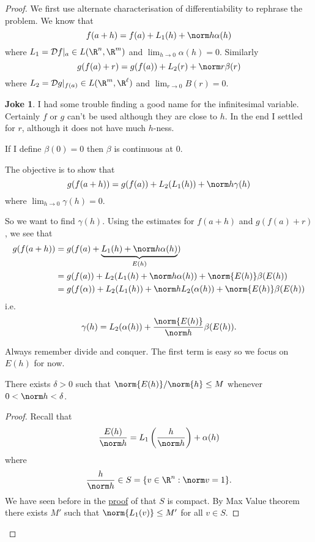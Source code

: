 \documentclass[a4paper]{article}
\newcommand*{\D}{\mathcal{D}}
\theoremstyle{definition}
\newtheorem*{joke}{Joke}
\begin{document}
\begin{proof}
  We first use alternate characterisation of differentiability to rephrase the problem. We know that
  \[
    f(a + h) = f(a) + L_1(h) + \norm h \alpha(h)
  \]
  where \(L_1 = \D f|_a \in L(\R^n, \R^m)\) and \(\lim_{h \to 0} \alpha(h) = 0\). Similarly
  \[
    g(f(a) + r) = g(f(a)) + L_2(r) + \norm r \beta(r)
  \]
  where \(L_2 = \D g|_{f(a)} \in L(\R^m, \R^\ell)\) and \(\lim_{r \to 0} B(r) = 0\).
  \begin{joke}
    I had some trouble finding a good name for the infinitesimal variable. Certainly \(f\) or \(g\) can't be used although they are close to \(h\). In the end I settled for \(r\), although it does not have much \(h\)-ness.
  \end{joke}
  
  \begin{note}
    If I define \(\beta(0) = 0\) then \(\beta\) is continuous at \(0\).
  \end{note}

  The objective is to show that
  \[
    g(f(a + h)) = g(f(a)) + L_2(L_1(h)) + \norm h \gamma(h)
  \]
  where \(\lim_{h \to 0} \gamma(h) = 0\).

  So we want to find \(\gamma(h)\). Using the estimates for \(f(a + h)\) and \(g(f(a) + r)\), we see that
  \begin{align*}
    g(f(a + h)) &= g(f(a) + \underbrace{L_1(h) + \norm h \alpha(h)}_{E(h)}) \\
                &= g(f(a)) + L_2(L_1(h) + \norm h \alpha(h)) + \norm{E(h)} \beta(E(h)) \\
                &= g(f(\alpha)) + L_2(L_1(h)) + \norm h L_2(\alpha(h)) + \norm{E(h)} \beta(E(h)) 
  \end{align*}
  i.e.
  \[
    \gamma(h) = L_2(\alpha(h)) + \frac{\norm{E(h)}}{\norm h} \beta(E(h)).
  \]

  Always remember divide and conquer. The first term is easy so we focus on \(E(h)\) for now.

  \begin{lemma}
    There exists \(\delta > 0\) such that \(\norm{E(h)}/\norm{h} \leq M\) whenever \(0 < \norm h < \delta\).
  \end{lemma}

  \begin{proof}
    Recall that
    \[
      \frac{E(h)}{\norm h} = L_1\left( \frac{h}{\norm h} \right) + \alpha(h)
    \]
    where
    \[
      \frac{h}{\norm h} \in S = \{v \in \R^n : \norm v = 1\}.
    \]
    We have seen before in the \hyperref[proof:Lipschitz equivalence]{proof} of  that \(S\) is compact. By Max Value theorem there exists \(M'\) such that \(\norm{L_1(v)} \leq M'\) for all \(v \in S\).


\end{proof}
\end{proof}
\end{document}
